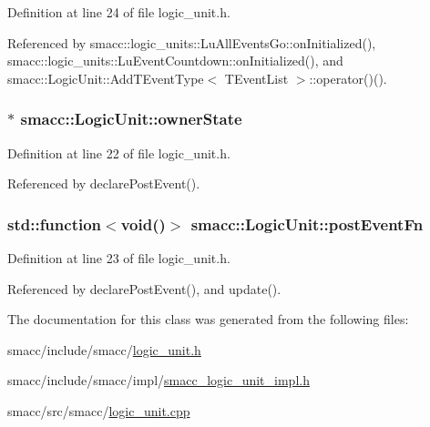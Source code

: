 Definition at line 24 of file logic\+\_\+unit.\+h.



Referenced by smacc\+::logic\+\_\+units\+::\+Lu\+All\+Events\+Go\+::on\+Initialized(), smacc\+::logic\+\_\+units\+::\+Lu\+Event\+Countdown\+::on\+Initialized(), and smacc\+::\+Logic\+Unit\+::\+Add\+T\+Event\+Type$<$ T\+Event\+List $>$\+::operator()().

\subsubsection[{\texorpdfstring{owner\+State}{ownerState}}]{$\ast$ smacc\+::\+Logic\+Unit\+::owner\+State}\hypertarget{classsmacc_1_1LogicUnit_a8863d227f46868876632b07b500f27d6}{}\label{classsmacc_1_1LogicUnit_a8863d227f46868876632b07b500f27d6}


Definition at line 22 of file logic\+\_\+unit.\+h.



Referenced by declare\+Post\+Event().

\subsubsection[{\texorpdfstring{post\+Event\+Fn}{postEventFn}}]{\setlength{\rightskip}{0pt plus 5cm}std\+::function$<$void()$>$ smacc\+::\+Logic\+Unit\+::post\+Event\+Fn}\hypertarget{classsmacc_1_1LogicUnit_ac75aaeeea0e8d3667763a332ecfd65f7}{}\label{classsmacc_1_1LogicUnit_ac75aaeeea0e8d3667763a332ecfd65f7}


Definition at line 23 of file logic\+\_\+unit.\+h.



Referenced by declare\+Post\+Event(), and update().



The documentation for this class was generated from the following files\+:\begin{DoxyCompactItemize}
\item 
smacc/include/smacc/\hyperlink{logic__unit_8h}{logic\+\_\+unit.\+h}\item 
smacc/include/smacc/impl/\hyperlink{smacc__logic__unit__impl_8h}{smacc\+\_\+logic\+\_\+unit\+\_\+impl.\+h}\item 
smacc/src/smacc/\hyperlink{logic__unit_8cpp}{logic\+\_\+unit.\+cpp}\end{DoxyCompactItemize}
